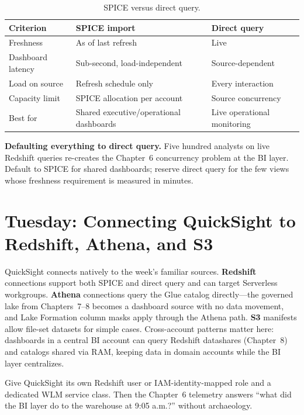 \begin{table}[H]
\centering
\small
\begin{tabular}{@{}p{3.4cm}p{4.4cm}p{4.4cm}@{}}
\toprule
\textbf{Criterion} & \textbf{SPICE import} & \textbf{Direct query} \\
\midrule
Freshness & As of last refresh & Live \\
Dashboard latency & Sub-second, load-independent & Source-dependent \\
Load on source & Refresh schedule only & Every interaction \\
Capacity limit & SPICE allocation per account & Source concurrency \\
Best for & Shared executive/operational dashboards & Live operational monitoring \\
\bottomrule
\end{tabular}
\caption{SPICE versus direct query.}
\label{tab:ch16-spice}
\end{table}

\begin{pitfall}
\textbf{Defaulting everything to direct query.} Five hundred analysts on live Redshift queries re-creates the Chapter~6 concurrency problem at the BI layer. Default to SPICE for shared dashboards; reserve direct query for the few views whose freshness requirement is measured in minutes.
\end{pitfall}

\section{Tuesday: Connecting QuickSight to Redshift, Athena, and S3}
QuickSight connects natively to the week's familiar sources. \textbf{Redshift} connections support both SPICE and direct query and can target Serverless workgroups. \textbf{Athena} connections query the Glue catalog directly---the governed lake from Chapters~7--8 becomes a dashboard source with no data movement, and Lake Formation column masks apply through the Athena path. \textbf{S3} manifests allow file-set datasets for simple cases. Cross-account patterns matter here: dashboards in a central BI account can query Redshift datashares (Chapter~8) and catalogs shared via RAM, keeping data in domain accounts while the BI layer centralizes.

\begin{tipbox}
Give QuickSight its own Redshift user or IAM-identity-mapped role and a dedicated WLM service class. Then the Chapter~6 telemetry answers ``what did the BI layer do to the warehouse at 9:05 a.m.?'' without archaeology.
\end{tipbox}

